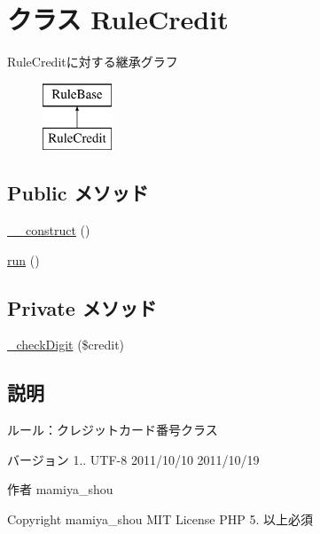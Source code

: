 \hypertarget{class_rule_credit}{
\section{クラス \-Rule\-Credit}
\label{class_rule_credit}
}
\-Rule\-Creditに対する継承グラフ\begin{figure}[H]
\begin{center}
\leavevmode
\includegraphics[height=2.000000cm]{class_rule_credit}
\end{center}
\end{figure}
\subsection*{\-Public メソッド}
\begin{DoxyCompactItemize}
\item 
\hyperlink{class_rule_credit_a095c5d389db211932136b53f25f39685}{\-\_\-\-\_\-construct} ()
\item 
\hyperlink{class_rule_credit_afb0fafe7e02a3ae1993c01c19fad2bae}{run} ()
\end{DoxyCompactItemize}
\subsection*{\-Private メソッド}
\begin{DoxyCompactItemize}
\item 
\hyperlink{class_rule_credit_a21d9d90184acdbad763706adb6a15f1d}{\-\_\-check\-Digit} (\$credit)
\end{DoxyCompactItemize}


\subsection{説明}
ルール：クレジットカード番号クラス

\begin{DoxyVersion}{バージョン}
1..  \-U\-T\-F-\/8  2011/10/10  2011/10/19 
\end{DoxyVersion}
\begin{DoxyAuthor}{作者}
mamiya\-\_\-shou 
\end{DoxyAuthor}
\begin{DoxyCopyright}{\-Copyright}
mamiya\-\_\-shou  \-M\-I\-T \-License  \-P\-H\-P 5. 以上必須 
\end{DoxyCopyright}


